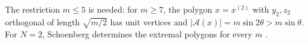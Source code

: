 \begin{remark}
  The restriction $m \leq 5$ is needed: for $m \geq 7$, the polygon
  $x = x^{(2)}$ with $y_{2}, z_{2}$ orthogonal of length $\sqrt{m/2}$ has
  unit vertices and $|\mathcal{A}(x)| = m\sin 2\theta > m\sin\theta$. For
  $N = 2$, Schoenberg determines the extremal polygons for every $m$
  \cite[Theorem~5]{schoenberg-1950}.
\end{remark}
